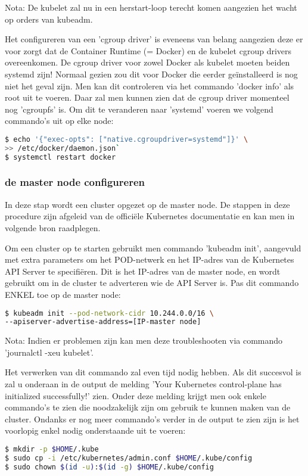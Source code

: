 Nota: De kubelet zal nu in een herstart-loop terecht komen aangezien het wacht op orders van kubeadm.

Het configureren van een 'cgroup driver' is eveneens van belang aangezien deze er voor zorgt dat de Container Runtime (= Docker) en de kubelet cgroup drivers overeenkomen. De cgroup driver voor zowel Docker als kubelet moeten beiden systemd zijn! 
Normaal gezien zou dit voor Docker die eerder geïnstalleerd is nog niet het geval zijn. Men kan dit controleren via het commando 'docker info' als root uit te voeren. Daar zal men kunnen zien dat de cgroup driver momenteel nog 'cgroupfs' is. Om dit te veranderen naar 'systemd' voeren we volgend commando's uit op elke node: 
\begin{lstlisting}[language=bash]
$ echo '{"exec-opts": ["native.cgroupdriver=systemd"]}' \ 
>> /etc/docker/daemon.json`
$ systemctl restart docker
\end{lstlisting}

\subsubsection{de master node configureren}

In deze stap wordt een cluster opgezet op de master node. De stappen in deze procedure zijn afgeleid van de officiële Kubernetes documentatie en kan men in volgende bron raadplegen. \autocite{Kubernetes2022b}

Om een cluster op te starten gebruikt men commando 'kubeadm init', aangevuld met extra parameters om het POD-netwerk en het IP-adres van de Kubernetes API Server te specifiëren. Dit is het IP-adres van de master node, en wordt gebruikt om in de cluster te adverteren wie de API Server is. Pas dit commando ENKEL toe op de master node: 
\begin{lstlisting}[language=bash]
$ kubeadm init --pod-network-cidr 10.244.0.0/16 \
--apiserver-advertise-address=[IP-master node]
\end{lstlisting}

Nota: Indien er problemen zijn kan men deze troubleshooten via commando 'journalctl -xeu kubelet'. 

Het verwerken van dit commando zal even tijd nodig hebben. Als dit succesvol is zal u onderaan in de output de melding 'Your Kubernetes control-plane has initialized successfully!' zien. Onder deze melding krijgt men ook enkele commando's te zien die noodzakelijk zijn om gebruik te kunnen maken van de cluster. Ondanks er nog meer commando's verder in de output te zien zijn is het voorlopig enkel nodig onderstaande uit te voeren:
\begin{lstlisting}[language=bash]
$ mkdir -p $HOME/.kube
$ sudo cp -i /etc/kubernetes/admin.conf $HOME/.kube/config
$ sudo chown $(id -u):$(id -g) $HOME/.kube/config
\end{lstlisting}

